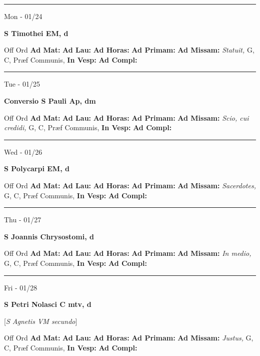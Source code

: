 \documentclass[letterpaper, 10pt]{article}
\begin{document}
\hrule
\begin{center}
Mon - 01/24
\end{center}\textbf{ \large S Timothei EM, \textnormal{\normalsize d}}
\begin{justify}
Off Ord
\textbf{Ad Mat: }
\textbf{Ad Lau: }
\textbf{Ad Horas: }
\textbf{Ad Primam: }
\textbf{Ad Missam:} \textit{Statuit, } G, C, Præf Communis, 
\textbf{In Vesp: }
\textbf{Ad Compl: }\end{justify}



\hrule
\begin{center}
Tue - 01/25
\end{center}\textbf{ \large Conversio S Pauli Ap, \textnormal{\normalsize dm}}
\begin{justify}
Off Ord
\textbf{Ad Mat: }
\textbf{Ad Lau: }
\textbf{Ad Horas: }
\textbf{Ad Primam: }
\textbf{Ad Missam:} \textit{Scio, cui credidi, } G, C, Præf Communis, 
\textbf{In Vesp: }
\textbf{Ad Compl: }\end{justify}



\hrule
\begin{center}
Wed - 01/26
\end{center}\textbf{ \large S Polycarpi EM, \textnormal{\normalsize d}}
\begin{justify}
Off Ord
\textbf{Ad Mat: }
\textbf{Ad Lau: }
\textbf{Ad Horas: }
\textbf{Ad Primam: }
\textbf{Ad Missam:} \textit{Sacerdotes, } G, C, Præf Communis, 
\textbf{In Vesp: }
\textbf{Ad Compl: }\end{justify}



\hrule
\begin{center}
Thu - 01/27
\end{center}\textbf{ \large S Joannis Chrysostomi, \textnormal{\normalsize d}}
\begin{justify}
Off Ord
\textbf{Ad Mat: }
\textbf{Ad Lau: }
\textbf{Ad Horas: }
\textbf{Ad Primam: }
\textbf{Ad Missam:} \textit{In medio, } G, C, Præf Communis, 
\textbf{In Vesp: }
\textbf{Ad Compl: }\end{justify}



\hrule
\begin{center}
Fri - 01/28
\end{center}\textbf{ \large S Petri Nolasci C mtv, \textnormal{\normalsize d}}

[\textit{S Agnetis VM secundo}]
\begin{justify}
Off Ord
\textbf{Ad Mat: }
\textbf{Ad Lau: }
\textbf{Ad Horas: }
\textbf{Ad Primam: }
\textbf{Ad Missam:} \textit{Justus, } G, C, Præf Communis, 
\textbf{In Vesp: }
\textbf{Ad Compl: }\end{justify}
\end{document}

